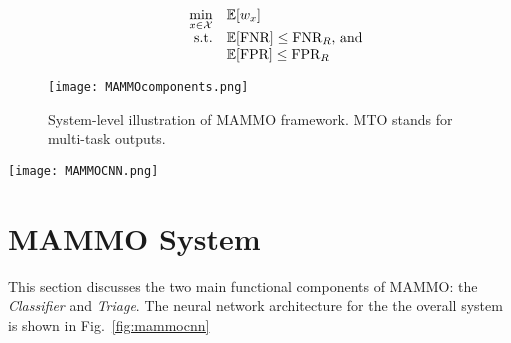 \documentclass[journal]{IEEEtran}
\begin{document}
\begin{equation} \label{eq:maximize}
   \begin{array}{rrclcl}
    \displaystyle \min_{x \in \mathcal{X}} & \multicolumn{3}{l}{\mathbb{E}[w_x]} \\
    \textrm{s.t.} & \text{$\mathbb{E}[$FNR$]$} \leq \text{FNR}_{R} \text{, and}\\
     & \multicolumn{3}{l}{\text{$\mathbb{E}[$FPR$]$} \leq \text{FPR}_{R}} \\
\end{array}
\end{equation}  


\begin{figure}[t!]
\centering
    \texttt{[image: MAMMOcomponents.png]}
    \caption{\label{fig:mammocomponents} System-level illustration of MAMMO framework. MTO stands for multi-task outputs.}
\end{figure}

\begin{figure*}[!t]
  \texttt{[image: MAMMOCNN.png]}
  \caption{Full MAMMO network as a stacked classifier of 4 MAMMO CNNs. Highlighted are the multi-task outputs of each view and how they are fused to generate the \textit{Classifier} and \textit{Triage} networks.}
  \label{fig:mammocnn}
\end{figure*}


\section{MAMMO System}

This section discusses the two main functional components of MAMMO: the \textit{Classifier} and \textit{Triage}.  The neural network architecture for the the overall system is shown in Fig.~\ref{fig:mammocnn} 
\end{document}
